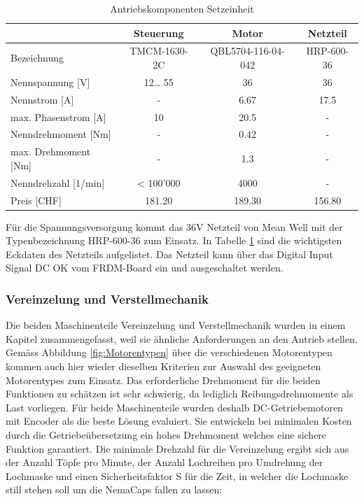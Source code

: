 \begin{table}[H]
	\centering
	\caption{Antriebskomponenten Setzeinheit \protect\cite{Trinamic} \protect\cite{36V_Netzteil}}
	\begin{tabular}{|l|c|c|c|}
		\hline 
		 & \textbf{Steuerung} & \textbf{Motor} & \textbf{Netzteil} \\
		\hline
		Bezeichnung & TMCM-1630-2C & QBL5704-116-04-042 & HRP-600-36 \\
		\hline
		Nennspannung [V] & 12… 55 & 36    & 36 \\
		\hline
		Nennstrom [A] & -     & 6.67  & 17.5 \\
		\hline
		max. Phasenstrom [A] & 10    & 20.5  & - \\
		\hline
		Nenndrehmoment [Nm] & -     & 0.42  & - \\
		\hline
		max. Drehmoment [Nm] & -     & 1.3   & - \\
		\hline
		Nenndrehzahl [1/min] & < 100'000 & 4000  & - \\
		\hline
		Preis [CHF] & 181.20 & 189.30 & 156.80 \\
		\hline
	\end{tabular}
	\label{tab:Trinamic}
\end{table}


Für die Spannungsversorgung kommt das 36V Netzteil von Mean Well mit der Typenbezeichnung HRP-600-36 zum Einsatz. In Tabelle \ref{tab:Trinamic} sind die wichtigsten Eckdaten des Netzteils aufgelistet. Das Netzteil kann über das Digital Input Signal DC OK vom FRDM-Board ein und ausgeschaltet werden.


\subsubsection{Vereinzelung und Verstellmechanik}
Die beiden Maschinenteile Vereinzelung und Verstellmechanik wurden in einem Kapitel zusammengefasst, weil sie ähnliche Anforderungen an den Antrieb stellen. Gemäss Abbildung \ref{fig:Motorentypen} über die verschiedenen Motorentypen kommen auch hier wieder dieselben Kriterien zur Auswahl des geeigneten Motorentypes zum Einsatz. Das erforderliche Drehmoment für die beiden Funktionen zu schätzen ist sehr schwierig, da lediglich Reibungsdrehmomente als Last vorliegen. Für beide Maschinenteile wurden deshalb DC-Getriebemotoren mit Encoder als die beste Lösung evaluiert. Sie entwickeln bei minimalen Kosten durch die Getriebeübersetzung ein hohes Drehmoment welches eine sichere Funktion garantiert. Die minimale Drehzahl für die Vereinzelung ergibt sich aus der Anzahl Töpfe pro Minute, der Anzahl Lochreihen pro Umdrehung der Lochmaske und einen Sicherheitsfaktor S für die Zeit, in welcher die Lochmaske still stehen soll um die NemaCaps fallen zu lassen:

